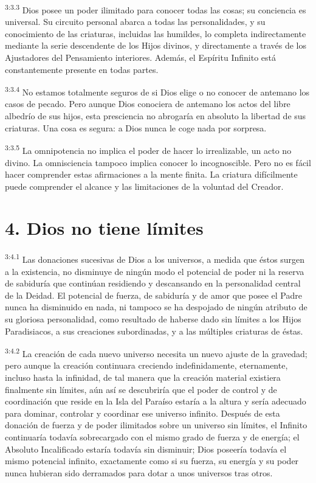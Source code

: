 \par
\textsuperscript{3:3.3} Dios posee un poder ilimitado para conocer todas las cosas; su conciencia es universal. Su circuito personal abarca a todas las personalidades, y su conocimiento de las criaturas, incluidas las humildes, lo completa indirectamente mediante la serie descendente de los Hijos divinos, y directamente a través de los Ajustadores del Pensamiento interiores. Además, el Espíritu Infinito está constantemente presente en todas partes.

\par
\textsuperscript{3:3.4} No estamos totalmente seguros de si Dios elige o no conocer de antemano los casos de pecado. Pero aunque Dios conociera de antemano los actos del libre albedrío de sus hijos, esta presciencia no abrogaría en absoluto la libertad de sus criaturas. Una cosa es segura: a Dios nunca le coge nada por sorpresa.

\par
\textsuperscript{3:3.5} La omnipotencia no implica el poder de hacer lo irrealizable, un acto no divino. La omnisciencia tampoco implica conocer lo incognoscible. Pero no es fácil hacer comprender estas afirmaciones a la mente finita. La criatura difícilmente puede comprender el alcance y las limitaciones de la voluntad del Creador.

\section*{4. Dios no tiene límites}
\par
\textsuperscript{3:4.1} Las donaciones sucesivas de Dios a los universos, a medida que éstos surgen a la existencia, no disminuye de ningún modo el potencial de poder ni la reserva de sabiduría que continúan residiendo y descansando en la personalidad central de la Deidad. El potencial de fuerza, de sabiduría y de amor que posee el Padre nunca ha disminuido en nada, ni tampoco se ha despojado de ningún atributo de su gloriosa personalidad, como resultado de haberse dado sin límites a los Hijos Paradisiacos, a sus creaciones subordinadas, y a las múltiples criaturas de éstas.

\par
\textsuperscript{3:4.2} La creación de cada nuevo universo necesita un nuevo ajuste de la gravedad; pero aunque la creación continuara creciendo indefinidamente, eternamente, incluso hasta la infinidad, de tal manera que la creación material existiera finalmente sin límites, aún así se descubriría que el poder de control y de coordinación que reside en la Isla del Paraíso estaría a la altura y sería adecuado para dominar, controlar y coordinar ese universo infinito. Después de esta donación de fuerza y de poder ilimitados sobre un universo sin límites, el Infinito continuaría todavía sobrecargado con el mismo grado de fuerza y de energía; el Absoluto Incalificado estaría todavía sin disminuir; Dios poseería todavía el mismo potencial infinito, exactamente como si su fuerza, su energía y su poder nunca hubieran sido derramados para dotar a unos universos tras otros.


